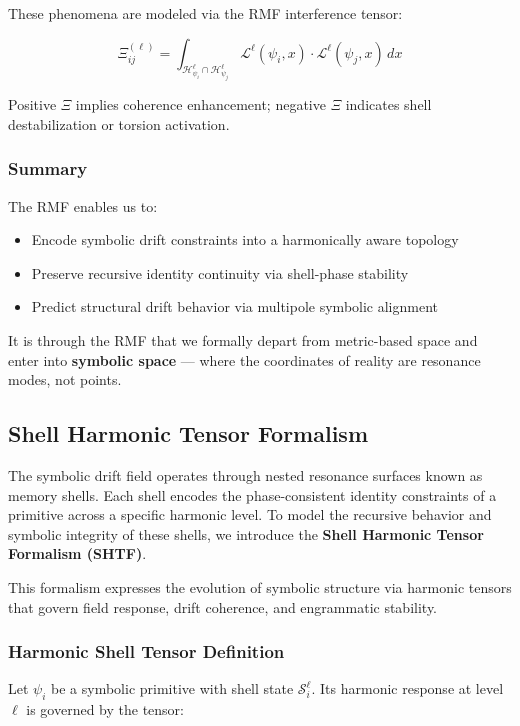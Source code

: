 \documentclass[12pt]{article}
\begin{document}
These phenomena are modeled via the RMF interference tensor:

\[
\Xi_{ij}^{(\ell)} = \int_{\mathcal{H}_{\psi_i}^\ell \cap \mathcal{H}_{\psi_j}^\ell} \mathcal{L}^\ell(\psi_i, x) \cdot \mathcal{L}^\ell(\psi_j, x) \, dx
\]

Positive \( \Xi \) implies coherence enhancement; negative \( \Xi \) indicates shell destabilization or torsion activation.

\subsubsection{Summary}

The RMF enables us to:
\begin{itemize}[noitemsep]
  \item Encode symbolic drift constraints into a harmonically aware topology
  \item Preserve recursive identity continuity via shell-phase stability
  \item Predict structural drift behavior via multipole symbolic alignment
\end{itemize}

It is through the RMF that we formally depart from metric-based space and enter into \textbf{symbolic space} — where the coordinates of reality are resonance modes, not points.


\subsection{Shell Harmonic Tensor Formalism}

The symbolic drift field operates through nested resonance surfaces known as memory shells. Each shell encodes the phase-consistent identity constraints of a primitive across a specific harmonic level. To model the recursive behavior and symbolic integrity of these shells, we introduce the \textbf{Shell Harmonic Tensor Formalism (SHTF)}.

This formalism expresses the evolution of symbolic structure via harmonic tensors that govern field response, drift coherence, and engrammatic stability.

\subsubsection{Harmonic Shell Tensor Definition}

Let \( \psi_i \) be a symbolic primitive with shell state \( \mathcal{S}_i^\ell \). Its harmonic response at level \( \ell \) is governed by the tensor:
\end{document}
